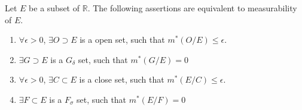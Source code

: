\documentclass[lang=en, 12pt]{elegantbook}
\newcommand{\RR}{\mathbb{R}}
\begin{document}
            \begin{theorem}
                Let $E$ be a subset of $\RR$. The following assertions are equivalent to measurability of $E$.
                \begin{enumerate}
                    \item $\forall \epsilon > 0$, $\exists O \supset E$ is a open set, such that $m^*(O/E) \leq \epsilon$.
                    \item $\exists G \supset E$ is a $G_{\delta}$ set, such that $m^*(G/E) = 0$
                    \item $\forall \epsilon > 0$, $\exists C \subset E$ is a close set, such that $m^*(E/C) \leq \epsilon$.
                    \item $\exists F \subset E$ is a $F_{\sigma}$ set, such that $m^*(E/F) = 0$
                \end{enumerate} 
            \end{theorem}
\end{document}
